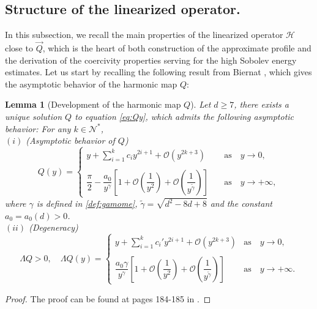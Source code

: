 \documentclass[11pt]{aims}
\newtheorem{lemma}[theorem]{Lemma}
\theoremstyle{definition}
\numberwithin{equation}{section}
\begin{document}
\subsection{Structure of the linearized operator.}
In this subsection, we recall the main properties of the linearized operator ${\mathscr{H}}$ close to $\vec Q$, which is the heart of both construction of the approximate profile and the derivation of the coercivity properties serving for the high Sobolev energy estimates. Let us start by recalling the following result from Biernat \cite{BIEnon2015}, which gives the asymptotic behavior of the harmonic map $Q$:
\begin{lemma}[Development of the harmonic map $Q$] Let $d \geq 7$, there exists a unique solution $Q$ to equation \eqref{eq:Qy}, which admits the following asymptotic behavior: For any $k \in{\mathcal{N}}^*$,\\
$(i)$ (Asymptotic behavior of $Q$) 
\begin{equation}\label{eq:asymQ}
Q(y) = \left\{\begin{array}{ll}
y + \sum \limits_{i = 1}^kc_iy^{2i + 1} + {\mathcal{O}}(y^{2k + 3}) &\text{as}\quad y \to 0, \\
&\\
\dfrac{\pi}{2} - \dfrac{a_0}{ y^{\gamma}}\left[1 + {\mathcal{O}}\left(\dfrac 1{y^{2}}\right) + {\mathcal{O}}\left(\dfrac 1 {y^{ \tilde{\gamma}}}\right)\right]\quad &\text{as} \quad y \to + \infty,
\end{array}
\right.
\end{equation}
where  $\gamma$ is defined in \eqref{def:gamome}, $\tilde{\gamma} = \sqrt{d^2 - 8d + 8}$ and the constant $a_0 = a_0(d) > 0$.\\
$(ii)$ (Degeneracy)
\begin{equation}\label{eq:asymLamQ}
\Lambda Q > 0, \quad \Lambda Q(y) = \left\{\begin{array}{ll}
y + \sum\limits_{i = 1}^kc_i' y^{2i + 1} + {\mathcal{O}}(y^{2k + 3}) &\text{as}\quad y \to 0, \\
&\\
\dfrac{a_0 \gamma}{ y^{\gamma}}\left[1 + {\mathcal{O}}\left(\dfrac 1{y^{2}}\right) + {\mathcal{O}}\left(\dfrac 1 {y^{ \tilde{\gamma}}}\right)\right]\quad &\text{as} \quad y \to + \infty.
\end{array}
\right.
\end{equation}
\end{lemma}
\begin{proof} The proof can be found at pages 184-185 in \cite{BIEnon2015}.
\end{proof}
\end{document}

